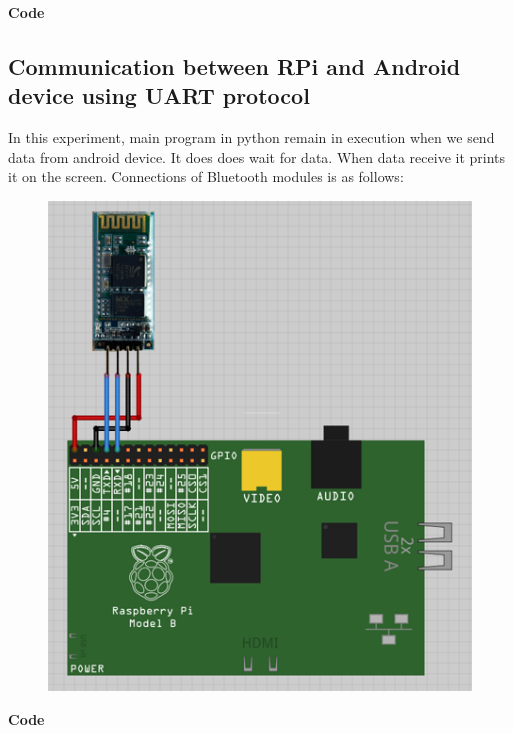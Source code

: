 \documentclass[11pt,a4paper]{article}
\begin{document}
	\textbf{Code}
	\vspace{0.3cm}
	
	
	\subsection{Communication between RPi and Android device using UART protocol}  
	In this experiment, main program in python remain in execution when we send data from android device. It does does wait for data. When data receive it prints it on the screen.
	\newpage
	Connections of Bluetooth modules is as follows:\\
	\vspace{5mm}
	\begin{figure}
		\centering
		\includegraphics[scale = 0.4]{bluetooth.png}
	\end{figure}
	\textbf{Code}
	\vspace{0.3cm}
	 
	
\end{document}
